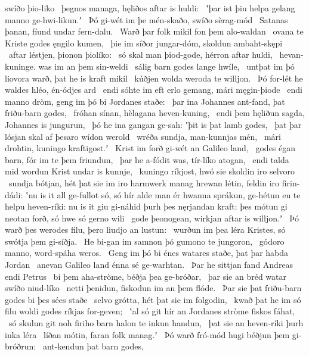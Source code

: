 swíðo þio-liko \hld\ þegnos managa,
hęliðos aftar is huldi: \hld\ ʽþar ist þiu helpa gelang
manno ge-hwi-likun.ʼ \hld\ Þó gi-wét im þe mén-skaðo,
swíðo sèrag-mód \hld\ Satanas þanan,
fíund undar fern-dalu. \hld\ Warð þar folk mikil
fon þem alo-waldan \hld\ ovana te Kriste
godes ęngilo kumen, \hld\ þie im síðor jungar-dóm,
skoldun ambaht-skępi \hld\ aftar léstjen,
þionon þiolíko: \hld\ só skal man þiod-gode,
hérron aftar huldi, \hld\ hevan-kuninge.
was im an þem sin-weldi \hld\ sálig barn godes
lange hwíle, \hld\ untþat im þó liovora warð,
þat he is kraft mikil \hld\ kúðjen wolda
weroda te willjon. \hld\ Þó for-lét he waldes hléo,
én-ódjes ard \hld\ endi sóhte im eft erlo gemang,
mári męgin-þiode \hld\ endi manno dròm,
geng im þó bi Jordanes staðe: \hld\ þar ina Johannes ant-fand,
þat friðu-barn godes, \hld\ fróhan sínan,
hèlagana heven-kuning, \hld\ endi þem hęliðun sagda,
Johannes is jungurun, \hld\ þó he ina gangan ge-sah:
ʽþit is þat lamb godes, \hld\ þat þar lósjan skal
af þesaro wídon werold \hld\ wréða sundja,
man-kunnjas mén, \hld\ mári drohtin,
kuningo kraftigost.ʼ \hld\ Krist im forð gi-wét
an Galileo land, \hld\ godes égan barn,
fór im te þem friundun, \hld\ þar he a-fódit was,
tír-líko atogan, \hld\ endi talda mid wordun
Krist undar is kunnje, \hld\ kuningo ríkjost,
hwó sie skoldin iro selvoro \hld\ sundja bótjan,
hét þat sie im iro harmwerk manag \hld\ hrewan létin,
feldin iro firin-dádi: \hld\ ʽnu is it all ge-fullot só,
só hír alde man \hld\ ér hwanna sprákun,
ge-hétun eu te helpu \hld\ heven-ríki:
nu is it giu gi-náhid þurh þes nęrjandan kraft: \hld\ þes mótun gi neotan forð,
só hwe só gerno wili \hld\ gode þeonogean,
wirkjan aftar is willjon.ʼ \hld\ Þó warð þes werodes filu,
þero liudjo an lustun: \hld\ wurðun im þea léra Kristes,
só swótja þem gi-síðja. \hld\ He bi-gan im samnon þó
gumono te jungoron, \hld\ gódoro manno,
word-spáha weros. \hld\ Geng im þó bi énes watares staðe,
þat þar habda Jordan \hld\ anevan Galileo land
énna sé ge-warhtan. \hld\ Þar he sittjan fand
Andreas endi Petrus \hld\ bi þem aha-stròme,
béðja þea ge-bróðar, \hld\ þar sie an bréd watar
swíðo niud-líko \hld\ netti þenidun,
fiskodun im an þem flóde. \hld\ Þar sie þat friðu-barn godes
bi þes sées staðe \hld\ selvo grótta,
hét þat sie im folgodin, \hld\ kwað þat he im só filu woldi
godes ríkjas for-geven; \hld\ ʽal só git hír an Jordanes stròme
fiskos fáhat, \hld\ só skulun git noh firiho barn
halon te inkun handun, \hld\ þat sie an heven-ríki
þurh inka léra \hld\ líðan mótin,
faran folk manag.ʼ \hld\ Þó warð fró-mód hugi
béðjun þem gi-bróðrun: \hld\ ant-kendun þat barn godes,
